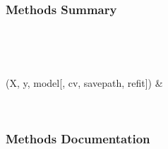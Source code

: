 \documentclass[letterpaper,10pt,english]{sphinxmanual}
\begin{document}
\begin{fulllineitems}
\begin{description}
\begin{description}
\begin{description}
\end{description}

\end{description}

\end{description}
\subsubsection*{Methods Summary}


\begin{savenotes}\sphinxatlongtablestart\begin{longtable}[c]{}
\hline

\endfirsthead

%
{}\\
\hline

\endhead

\hline
{}\\
\endfoot

\endlastfoot

{\hyperref[\detokenize{api/mastml.hyper_opt.RandomizedSearch:mastml.hyper_opt.RandomizedSearch.fit}]{}}(X, y, model{[}, cv, savepath, refit{]})
&

\\
\hline
\end{longtable}\sphinxatlongtableend\end{savenotes}
\subsubsection*{Methods Documentation}

\begin{fulllineitems}
\label{\detokenize{api/mastml.hyper_opt.RandomizedSearch:mastml.hyper_opt.RandomizedSearch.fit}}
\end{fulllineitems}


\end{fulllineitems}
\end{document}
